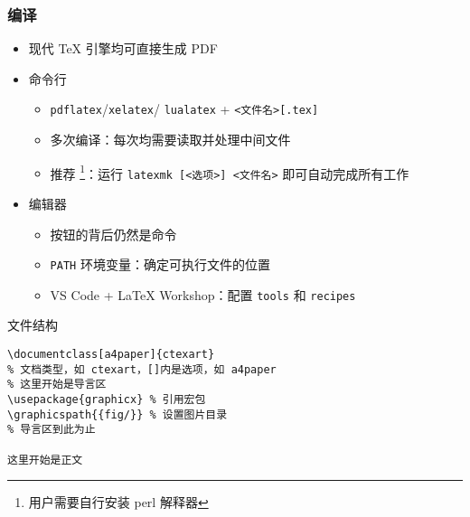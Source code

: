 \begin{frame}[fragile]
  \frametitle{编译}
  \begin{itemize}
    \item 现代 \TeX{} 引擎均可直接生成 PDF
    \item 命令行

          \begin{itemize}
            \item \verb|pdflatex|/\verb|xelatex|/
                  \verb|lualatex| + \verb|<文件名>[.tex]|
            \item 多次编译：每次均需要读取并处理中间文件
            \item 推荐 \footnote{\MiKTeX 用户需要自行安装 perl 解释器}：运行
                  \verb|latexmk [<选项>] <文件名>| 即可自动完成所有工作
          \end{itemize}

    \item 编辑器

          \begin{itemize}
            \item 按钮的背后仍然是命令
            \item \verb|PATH| 环境变量：确定可执行文件的位置
            \item VS Code + \LaTeX{} Workshop：配置 \verb|tools| 和
                  \verb|recipes|
          \end{itemize}
  \end{itemize}
\end{frame}

\begin{frame}[fragile]{文件结构}
  \lstset{language=[LaTeX]TeX}
  \begin{lstlisting}[basicstyle=\ttfamily]
\documentclass[a4paper]{ctexart}
% 文档类型，如 ctexart，[]内是选项，如 a4paper
% 这里开始是导言区
\usepackage{graphicx} % 引用宏包
\graphicspath{{fig/}} % 设置图片目录
% 导言区到此为止

这里开始是正文

  \end{lstlisting}
\end{frame}

